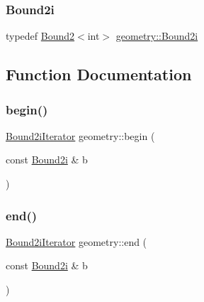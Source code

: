 \mbox{\label{namespacegeometry_a918a919c0a947983a121b11e5c64934f}} 
\subsubsection{\texorpdfstring{Bound2i}{Bound2i}}
{\footnotesize\ttfamily typedef \mbox{\hyperlink{classgeometry_1_1Bound2}{Bound2}}$<$int$>$ \mbox{\hyperlink{namespacegeometry_a918a919c0a947983a121b11e5c64934f}{geometry\+::\+Bound2i}}}



\subsection{Function Documentation}
\mbox{\label{namespacegeometry_ae6b3b3a9d89687f2a7b462c3988215b4}} 
\subsubsection{\texorpdfstring{begin()}{begin()}}
{\footnotesize\ttfamily \mbox{\hyperlink{classgeometry_1_1Bound2iIterator}{Bound2i\+Iterator}} geometry\+::begin (\begin{DoxyParamCaption}\item[{const \mbox{\hyperlink{namespacegeometry_a918a919c0a947983a121b11e5c64934f}{Bound2i}} \&}]{b }\end{DoxyParamCaption})\hspace{0.3cm}{\ttfamily [inline]}}

\mbox{\label{namespacegeometry_a7a69deaf127e8c263b56d8a4f2ce4a11}} 
\subsubsection{\texorpdfstring{end()}{end()}}
{\footnotesize\ttfamily \mbox{\hyperlink{classgeometry_1_1Bound2iIterator}{Bound2i\+Iterator}} geometry\+::end (\begin{DoxyParamCaption}\item[{const \mbox{\hyperlink{namespacegeometry_a918a919c0a947983a121b11e5c64934f}{Bound2i}} \&}]{b }\end{DoxyParamCaption})\hspace{0.3cm}{\ttfamily [inline]}}


